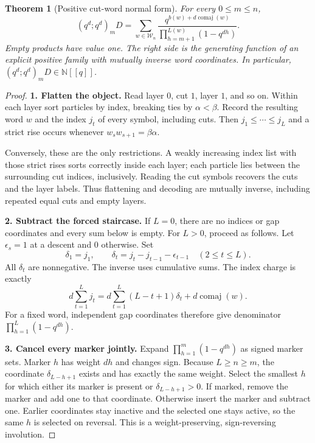 \documentclass[11pt,a4paper]{article}
\newtheorem{theorem}{Theorem}[section]
\theoremstyle{definition}
\newcommand{\cm}{\operatorname{comaj}}
\newcommand{\NN}{\mathbb N}
\begin{document}
\begin{theorem}[Positive cut-word normal form]\label{thm:general}
For every $0\le m\le n$,
\begin{equation}\label{eq:general}
(q^d;q^d)_mD
 =\sum_{w\in\mathcal W_n}
 \frac{q^{b(w)+d\cm(w)}}{\prod_{h=m+1}^{L(w)}(1-q^{dh})}.
\end{equation}
Empty products have value one. The right side is the generating function of
an explicit positive family with mutually inverse word coordinates.
In particular, $(q^d;q^d)_mD\in\NN[[q]]$.
\end{theorem}

\begin{proof}
\textbf{1. Flatten the object.}
Read layer $0$, cut $1$, layer $1$, and so on. Within each layer sort particles
by index, breaking ties by $\alpha<\beta$. Record the resulting word $w$
and the index $j_t$ of every symbol, including cuts. Then
$j_1\le\cdots\le j_L$ and a strict rise occurs whenever
$w_s w_{s+1}=\beta\alpha$.

Conversely, these are the only restrictions. A weakly increasing index list
with those strict rises sorts correctly inside each layer; each particle lies
between the surrounding cut indices, inclusively. Reading the cut symbols
recovers the cuts and the layer labels. Thus flattening and decoding are
mutually inverse, including repeated equal cuts and empty layers.

\textbf{2. Subtract the forced staircase.}
If $L=0$, there are no indices or gap coordinates and every sum below is empty.
For $L>0$, proceed as follows.
Let $\epsilon_s=1$ at a descent and $0$ otherwise. Set
\[
\delta_1=j_1,\qquad
\delta_t=j_t-j_{t-1}-\epsilon_{t-1}\quad(2\le t\le L).
\]
All $\delta_t$ are nonnegative. The inverse uses cumulative sums.
The index charge is exactly
\begin{equation}\label{eq:staircase}
d\sum_{t=1}^{L}j_t
 =d\sum_{t=1}^{L}(L-t+1)\delta_t+d\cm(w).
\end{equation}
For a fixed word, independent gap coordinates therefore give denominator
$\prod_{h=1}^{L}(1-q^{dh})$.

\textbf{3. Cancel every marker jointly.}
Expand $\prod_{h=1}^{m}(1-q^{dh})$ as signed marker sets.
Marker $h$ has weight $dh$ and changes sign. Because $L\ge n\ge m$,
the coordinate $\delta_{L-h+1}$ exists and has exactly the same weight.
Select the smallest $h$ for which either its marker is present or
$\delta_{L-h+1}>0$. If marked, remove the marker and add one to that
coordinate. Otherwise insert the marker and subtract one. Earlier coordinates
stay inactive and the selected one stays active, so the same $h$ is selected
on reversal. This is a weight-preserving, sign-reversing involution.


\end{proof}
\end{document}
